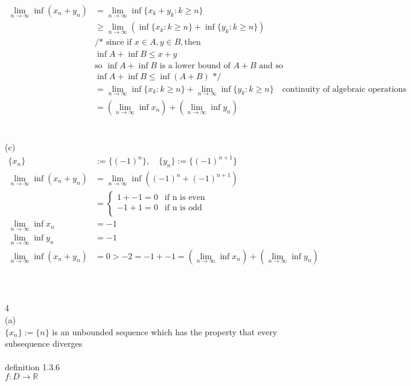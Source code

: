 \documentclass[12pt, border = 4pt, multi]{article} %
\begin{document}
\begin{align*}
\lim_{n \rightarrow \infty} \inf (x_n + y_n) &= \lim_{n \rightarrow \infty} \inf\{x_k + y_k: k \geq n\}\\
&\geq \lim_{n \rightarrow \infty} (\inf\{x_k: k \geq n\} + \inf\{y_k: k \geq n\})\\
&\text{/* since if } x \in A, y \in B, \text{then}\\
&\inf A + \inf B \leq x + y\\
&\text{so } \inf A + \inf B \text{ is a lower bound of } A + B \text{ and so}\\
&\inf A + \inf B \leq \inf(A + B) \text{ */}\\
&= \lim_{n \rightarrow \infty} \inf\{x_k: k \geq n\} + \lim_{n \rightarrow \infty} \inf\{y_k: k \geq n\}\quad\text{continuity of algebraic operations}\\
&= \left(\lim_{n \rightarrow \infty} \inf x_n \right) + \left(\lim_{n \rightarrow \infty} \inf y_n \right)
\end{align*}
\\
\\
(c)
\begin{align*}
\{x_n\} &:= \{(-1) ^ n\},\quad\{y_n\} := \{(-1) ^ {n + 1}\}\\
\lim_{n \rightarrow \infty}\inf(x_n + y_n) &= \lim_{n \rightarrow \infty}\inf((-1) ^ n + (-1) ^ {n + 1})\\
&=
\begin{cases}
1 + -1 = 0 & \text{if n is even}\\
-1 + 1 = 0 & \text{if n is odd}\\
\end{cases}\\
\lim_{n \rightarrow \infty}\inf x_n &= -1\\
\lim_{n \rightarrow \infty}\inf y_n &= -1\\
\lim_{n \rightarrow \infty}\inf(x_n + y_n) &= 0 > -2 = -1 + -1 = \left(\lim_{n \rightarrow \infty} \inf x_n \right) + \left(\lim_{n \rightarrow \infty} \inf y_n \right)
\end{align*}
\\
\\
\\
4\\
(a)\\
$\{x_n\} := \{n\}$ is an unbounded sequence which has the property that every subsequence diverges\\
\\
definition 1.3.6\\
$f: D \rightarrow \mathbb{R}$\\
\end{document}
